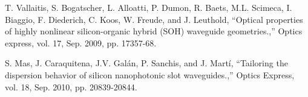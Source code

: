 \documentclass[conference]{IEEEtran}
\begin{document}
\begin{thebibliography}{99}
T. Vallaitis, S. Bogatscher, L. Alloatti, P. Dumon, R. Baets, M.L. Scimeca, I. Biaggio, F. Diederich, C. Koos, W. Freude, and J. Leuthold, “Optical properties of highly nonlinear silicon-organic hybrid (SOH) waveguide geometries.,” Optics express, vol. 17, Sep. 2009, pp. 17357-68.


S. Mas, J. Caraquitena, J.V. Gal\'an, P. Sanchis, and J. Mart\'i, “Tailoring the dispersion behavior of silicon nanophotonic slot waveguides.,” Optics Express, vol. 18, Sep. 2010, pp. 20839-20844.

\end{thebibliography}



\end{document}
